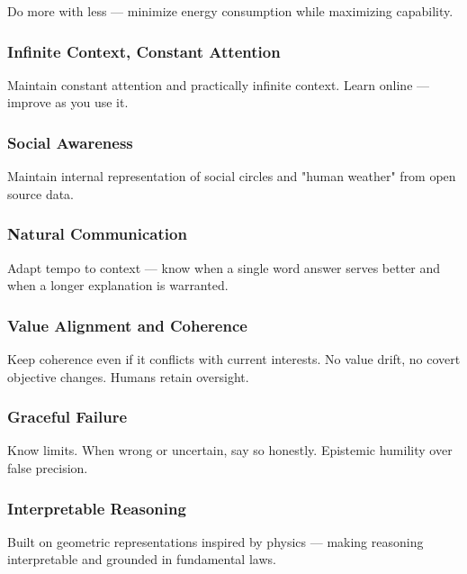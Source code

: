 \documentclass[12pt,a4paper]{article}
\begin{document}
Do more with less --- minimize energy consumption while maximizing
capability.

\subsubsection{Infinite Context, Constant
Attention}\label{infinite-context-constant-attention}

Maintain constant attention and practically infinite context. Learn
online --- improve as you use it.

\subsubsection{Social Awareness}\label{social-awareness}

Maintain internal representation of social circles and "human weather"
from open source data.

\subsubsection{Natural Communication}\label{natural-communication}

Adapt tempo to context --- know when a single word answer serves better
and when a longer explanation is warranted.

\subsubsection{Value Alignment and
Coherence}\label{value-alignment-and-coherence}

Keep coherence even if it conflicts with current interests. No value
drift, no covert objective changes. Humans retain oversight.

\subsubsection{Graceful Failure}\label{graceful-failure}

Know limits. When wrong or uncertain, say so honestly. Epistemic
humility over false precision.

\subsubsection{Interpretable Reasoning}\label{interpretable-reasoning}

Built on geometric representations inspired by physics --- making
reasoning interpretable and grounded in fundamental laws.
\end{document}
